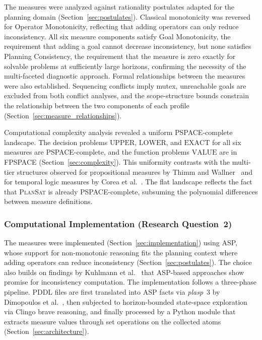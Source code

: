 The measures were analyzed against rationality postulates adapted for the planning domain (Section~\ref{sec:postulates}). Classical monotonicity was reversed for Operator Mo\-notonicity, reflecting that adding operators can only reduce inconsistency. All six measure components satisfy Goal Monotonicity, the requirement that adding a goal cannot decrease inconsistency, but none satisfies Planning Consistency, the requirement that the measure is zero exactly for solvable problems at sufficiently large horizons, confirming the necessity of the multi-faceted diagnostic approach. Formal relationships between the measures were also established. Sequencing conflicts imply mutex, unreachable goals are excluded from both conflict analyses, and the scope-structure bounds constrain the relationship between the two components of each profile (Section~\ref{sec:measure_relationships}).

Computational complexity analysis revealed a uniform PSPACE-complete landscape. The decision problems $\text{UPPER}$, $\text{LOWER}$, and $\text{EXACT}$ for all six measures are PSPACE-complete, and the function problems $\text{VALUE}$ are in FPSPACE (Section~\ref{sec:complexity}). This uniformity contrasts with the multi-tier structures observed for propositional measures by Thimm and Wallner~\cite{Thimm2016} and for temporal logic measures by Corea et al.~\cite{Corea2022}. The flat landscape reflects the fact that \textsc{PlanSat} is already PSPACE-complete, subsuming the polynomial differences between measure definitions.

\subsubsection{Computational Implementation (Research Question~2)}

The measures were implemented (Section~\ref{sec:implementation}) using \ac{ASP}, whose support for non-monotonic reasoning fits the planning context where adding operators can reduce inconsistency (Section~\ref{sec:postulates}). The choice also builds on findings by Kuhlmann et al.~\cite{Kuhlmann2025} that \ac{ASP}-based approaches show promise for inconsistency computation. The implementation follows a three-phase pipeline. \ac{PDDL} files are first translated into \ac{ASP} facts via \textit{plasp}~3 by Dimopoulos et al.~\cite{Dimopoulos2019}, then subjected to horizon-boun\-ded state-space exploration via Clingo brave reasoning, and finally processed by a Python module that extracts measure values through set operations on the collected atoms (Section~\ref{sec:architecture}).

